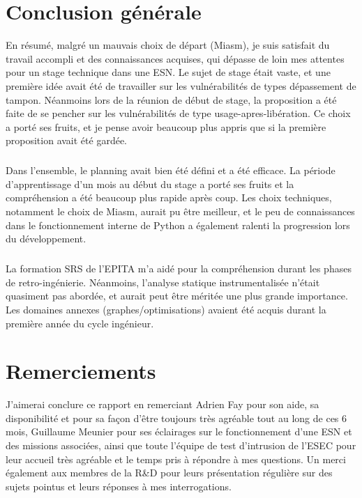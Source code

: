 \section{Conclusion générale}
En résumé, malgré un mauvais choix de départ (Miasm), je suis satisfait du travail accompli et des connaissances acquises, qui dépasse de loin mes attentes pour un stage technique dans une ESN.
Le sujet de stage était vaste, et une première idée avait été de travailler sur les vulnérabilités de types dépassement de tampon. Néanmoins lors de la réunion de début de stage, la proposition a été
faite de se pencher sur les vulnérabilités de type usage-apres-libération. Ce choix a porté ses fruits, et je pense avoir beaucoup plus appris que si la première proposition avait été gardée.
\subparagraph{}
Dans l'ensemble, le planning avait bien été défini et a été efficace. La période d'apprentissage d'un mois au début du stage a porté ses fruits et la compréhension a été beaucoup plus rapide
après coup. Les choix techniques, notamment le choix de Miasm, aurait pu être meilleur, et le peu de connaissances dans le fonctionnement interne de Python a également ralenti la progression
lors du développement.
\subparagraph{}
La formation SRS de l'EPITA m'a aidé pour la compréhension durant les phases de retro-ingénierie. Néanmoins, l'analyse statique instrumentalisée n'était quasiment pas abordée, et aurait peut être
méritée une plus grande importance. Les domaines annexes (graphes/optimisations) avaient été acquis durant la première année du cycle ingénieur.

\section{Remerciements}
J'aimerai conclure ce rapport en remerciant Adrien Fay pour son aide, sa disponibilité et pour sa façon d'être toujours très agréable tout au long de ces 6 mois,
Guillaume Meunier pour ses éclairages sur le fonctionnement d'une ESN et des missions associées, ainsi que toute l'équipe de test d'intrusion de l'ESEC pour leur accueil très agréable et le temps
pris à répondre à mes questions. Un merci également aux membres de la R\&D pour leurs présentation régulière sur des sujets pointus et leurs réponses à mes interrogations.
